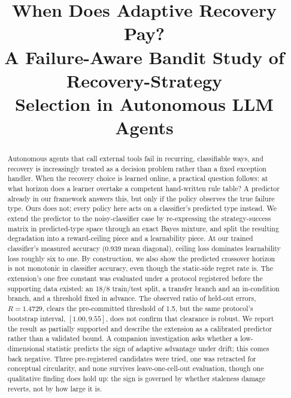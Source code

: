 \documentclass[conference]{IEEEtran}
\begin{document}
\title{When Does Adaptive Recovery Pay?\\
A Failure-Aware Bandit Study of Recovery-Strategy\\
Selection in Autonomous LLM Agents}

\author{
}

\maketitle

\begin{abstract}
Autonomous agents that call external tools fail in recurring, classifiable
ways, and recovery is increasingly treated as a decision problem rather
than a fixed exception handler. When the recovery choice is learned
online, a practical question follows: at what horizon does a learner
overtake a competent hand-written rule table? A predictor already in our
framework answers this, but only if the policy observes the true failure
type. Ours does not; every policy here acts on a classifier's predicted
type instead. We extend the predictor to the noisy-classifier case by
re-expressing the strategy-success matrix in predicted-type space through
an exact Bayes mixture, and split the resulting degradation into a
reward-ceiling piece and a learnability piece. At our trained classifier's
measured accuracy (0.939 mean diagonal), ceiling loss dominates
learnability loss roughly six to one. By construction, we also show the
predicted crossover horizon is not monotonic in classifier accuracy, even
though the static-side regret rate is. The extension's one free constant
was evaluated under a protocol registered before the supporting data
existed: an 18/8 train/test split, a transfer branch and an in-condition
branch, and a threshold fixed in advance. The observed ratio of held-out
errors, $R=1.4729$, clears the pre-committed threshold of 1.5, but the
same protocol's bootstrap interval, $[1.00, 9.55]$, does not confirm that
clearance is robust. We report the result as partially supported and
describe the extension as a calibrated predictor rather than a validated
bound. A companion investigation asks whether a low-dimensional statistic
predicts the sign of adaptive advantage under drift; this comes back
negative. Three pre-registered candidates were tried, one was retracted
for conceptual circularity, and none survives leave-one-cell-out
evaluation, though one qualitative finding does hold up: the sign is
governed by whether staleness damage reverts, not by how large it is.
\end{abstract}
\end{document}
